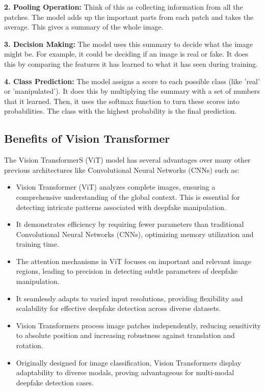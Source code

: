 \noindent \textbf{2. Pooling Operation:} Think of this as collecting information from all the patches. The model adds up the important parts from each patch and takes the average. This gives a summary of the whole image.

\noindent \textbf{3. Decision Making:} The model uses this summary to decide what the image might be. For example, it could be deciding if an image is real or fake. It does this by comparing the features it has learned to what it has seen during training.

\noindent \textbf{4. Class Prediction:} The model assigns a score to each possible class (like 'real' or 'manipulated'). It does this by multiplying the summary with a set of numbers that it learned. Then, it uses the softmax function to turn these scores into probabilities. The class with the highest probability is the final prediction.

\subsection{Benefits of Vision Transformer}

The Vision TransformerS (ViT) model has several advantages over many other previous architectures like Convolutional Neural Networks (CNNs) such as:

\begin{itemize}
    \item
          Vision Transformer (ViT) analyzes complete images, ensuring a comprehensive understanding of the global context. This is essential for detecting intricate patterns associated with deepfake manipulation.

    \item It demonstrates efficiency by requiring fewer parameters than traditional Convolutional Neural Networks (CNNs), optimizing memory utilization and training time.

    \item The attention mechanisms in ViT focuses on important and relevant image regions, leading to precision in detecting subtle parameters of deepfake manipulation.

    \item It seamlessly adapts to varied input resolutions, providing flexibility and scalability for effective deepfake detection across diverse datasets.

    \item Vision Transformers process image patches independently, reducing sensitivity to absolute position and increasing robustness against translation and rotation.

    \item Originally designed for image classification, Vision Transformers display adaptability to diverse modals, proving advantageous for multi-modal deepfake detection cases.

\end{itemize}
\newpage
